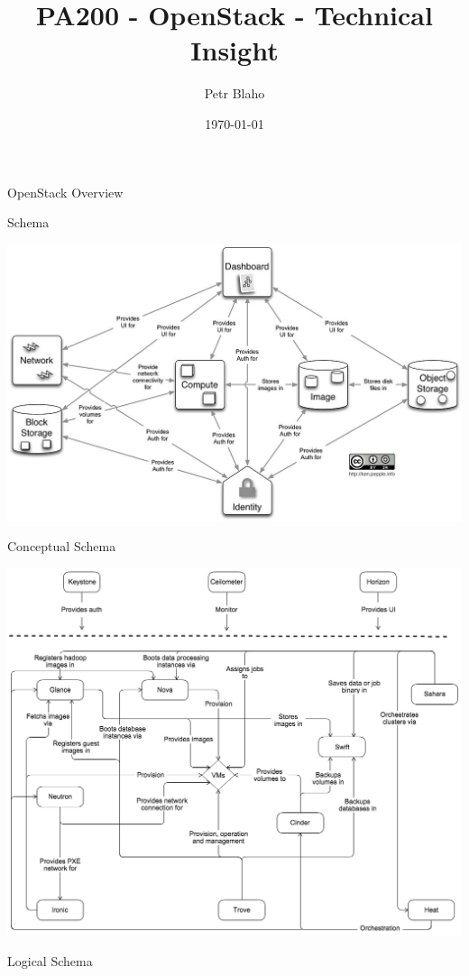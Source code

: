 \documentclass[presentation]{beamer}
\author{Petr Blaho}
\date{\today}
\title{PA200 - OpenStack - Technical Insight}
\begin{document}
\maketitle

\begin{frame}[label={sec:org7580345}]{OpenStack Overview}
\begin{block}{Schema}
\begin{center}
\includegraphics[width=.9\linewidth]{./openstack.jpg}
\end{center}
\end{block}
\begin{block}{Conceptual Schema}
\begin{center}
\includegraphics[width=.9\linewidth]{./openstack-conceptual-arch-kilo.png}
\end{center}
\end{block}
\begin{block}{Logical Schema}
\begin{center}

\end{center}
\end{block}
\end{frame}
\end{document}
